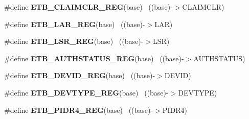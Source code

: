\begin{DoxyCompactItemize}
\item 
\hypertarget{group___e_t_b___register___accessor___macros_gab07e0a6927dc1764c98232f6f99b3234}{}\#define {\bfseries E\+T\+B\+\_\+\+C\+L\+A\+I\+M\+C\+L\+R\+\_\+\+R\+E\+G}(base)                                  ~((base)-\/$>$C\+L\+A\+I\+M\+C\+L\+R)\label{group___e_t_b___register___accessor___macros_gab07e0a6927dc1764c98232f6f99b3234}

\item 
\hypertarget{group___e_t_b___register___accessor___macros_gac75124828507bbcd9df24ab8a4084709}{}\#define {\bfseries E\+T\+B\+\_\+\+L\+A\+R\+\_\+\+R\+E\+G}(base)                                            ~((base)-\/$>$L\+A\+R)\label{group___e_t_b___register___accessor___macros_gac75124828507bbcd9df24ab8a4084709}

\item 
\hypertarget{group___e_t_b___register___accessor___macros_gaca7b71b796d591bb249270a2af85ca23}{}\#define {\bfseries E\+T\+B\+\_\+\+L\+S\+R\+\_\+\+R\+E\+G}(base)                                            ~((base)-\/$>$L\+S\+R)\label{group___e_t_b___register___accessor___macros_gaca7b71b796d591bb249270a2af85ca23}

\item 
\hypertarget{group___e_t_b___register___accessor___macros_gaa3258c2fe535e526cb4583178e67f1fc}{}\#define {\bfseries E\+T\+B\+\_\+\+A\+U\+T\+H\+S\+T\+A\+T\+U\+S\+\_\+\+R\+E\+G}(base)                              ~((base)-\/$>$A\+U\+T\+H\+S\+T\+A\+T\+U\+S)\label{group___e_t_b___register___accessor___macros_gaa3258c2fe535e526cb4583178e67f1fc}

\item 
\hypertarget{group___e_t_b___register___accessor___macros_gafa2a6c499747c9b7b95b97f0af8eead8}{}\#define {\bfseries E\+T\+B\+\_\+\+D\+E\+V\+I\+D\+\_\+\+R\+E\+G}(base)                                        ~((base)-\/$>$D\+E\+V\+I\+D)\label{group___e_t_b___register___accessor___macros_gafa2a6c499747c9b7b95b97f0af8eead8}

\item 
\hypertarget{group___e_t_b___register___accessor___macros_gac36252d853b0600a7aa961d72babf69c}{}\#define {\bfseries E\+T\+B\+\_\+\+D\+E\+V\+T\+Y\+P\+E\+\_\+\+R\+E\+G}(base)                                    ~((base)-\/$>$D\+E\+V\+T\+Y\+P\+E)\label{group___e_t_b___register___accessor___macros_gac36252d853b0600a7aa961d72babf69c}

\item 
\hypertarget{group___e_t_b___register___accessor___macros_gaabd66745bb19a195e8a4f40926b19608}{}\#define {\bfseries E\+T\+B\+\_\+\+P\+I\+D\+R4\+\_\+\+R\+E\+G}(base)                                        ~((base)-\/$>$P\+I\+D\+R4)\label{group___e_t_b___register___accessor___macros_gaabd66745bb19a195e8a4f40926b19608}


\end{DoxyCompactItemize}
